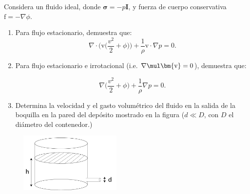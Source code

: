 \documentclass[../main.tex]{subfiles}
\begin{document}
\begin{problema}
	Considera un fluido ideal, donde \(\bm{\sigma} = -p \bm{I}\),
	y fuerza de cuerpo conservativa \(\bm{\mathrm{f}} = - \nabla{\phi}\).

	\begin{enumerate}
		\item Para flujo estacionario, demuestra que:
		      \begin{equation*}
			      \nabla \cdot{\Biggl(\bm{\mathrm{v}}\Biggl(\dfrac{v^{2}}{2} + \phi\Biggr)\Biggr)}
			      + \dfrac{1}{\rho}\bm{\mathrm{v}} \cdot \nabla{p} = 0.
		      \end{equation*}
		\item Para flujo estacionario e irrotacional (i.e. \(\nabla \mul\bm{\mathrm{v}} = 0\)),
		      demuestra que:

		      \begin{equation*}
			      \nabla{\Biggl(\dfrac{v^{2}}{2} + \phi\Biggr)} + \dfrac{1}{\rho}\nabla{p} = 0.
		      \end{equation*}
		\item Determina la velocidad y el gasto volumétrico del fluido en la salida
		      de la boquilla en la pared del depósito mostrado en la figura
		      (\(d \ll D\), con \(D\) el diámetro del contenedor.)
	\end{enumerate}

	\begin{figure}[htb]
		\centering
		\includegraphics[width=0.45\textwidth]{figs/problema02.png}
	\end{figure}
\end{problema}
\end{document}
